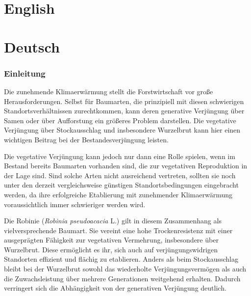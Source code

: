 \documentclass[twocolumn]{scrartcl}
\begin{document}
\renewcommand{\contentsname}{Contents / Inhaltsverzeichnis}
\tableofcontents

\clearpage

\part*{English}


\clearpage

\part*{Deutsch}
\section{Einleitung}

Die zunehmende Klimaerwärmung stellt die Forstwirtschaft vor große
Herausforderungen. Selbst für Baumarten, die prinzipiell mit diesen
schwierigen Standortsverhältnissen zurechtkommen, kann deren
generative Verjüngung über Samen oder über Aufforstung ein größeres
Problem darstellen. Die vegetative Verjüngung über Stockausschlag und
insbesondere Wurzelbrut kann hier einen wichtigen Beitrag bei der
Bestandesverjüngung leisten.

Die vegetative Verjüngung kann jedoch nur dann eine Rolle spielen,
wenn im Bestand bereits Baumarten vorhanden sind, die zur vegetativen
Reproduktion in der Lage sind. Sind solche Arten nicht ausreichend
vertreten, sollten sie noch unter den derzeit vergleichsweise
günstigen Standortsbedingungen eingebracht werden, da ihre
erfolgreiche Etablierung mit zunehmender Klimaerwärmung
voraussichtlich immer schwieriger werden wird.

Die Robinie (\emph{Robinia pseudoacacia} L.) gilt in diesem
Zusammenhang als vielversprechende Baumart. Sie vereint eine hohe
Trockenresistenz mit einer ausgeprägten Fähigkeit zur vegetativen
Vermehrung, insbesondere über Wurzelbrut. Diese ermöglicht es ihr,
sich auch auf verjüngungswidrigen Standorten effizient und flächig zu
etablieren. Anders als beim Stockausschlag bleibt bei der Wurzelbrut
sowohl das wiederholte Verjüngungsvermögen als auch die
Zuwachsleistung über mehrere Generationen weitgehend erhalten. Dadurch
verringert sich die Abhängigkeit von der generativen Verjüngung
deutlich.
\end{document}

